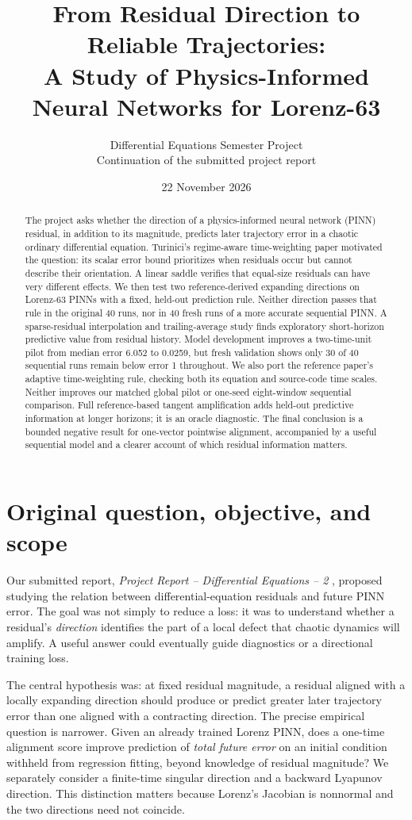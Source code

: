 \documentclass[11pt,a4paper]{article}
\title{From Residual Direction to Reliable Trajectories:\\A Study of Physics-Informed Neural Networks for Lorenz-63}
\author{Differential Equations Semester Project\\Continuation of the submitted project report}
\date{22 November 2026}
\begin{document}
\maketitle
\begin{abstract}
The project asks whether the direction of a physics-informed neural network (PINN) residual, in addition to its magnitude, predicts later trajectory error in a chaotic ordinary differential equation. Turinici's regime-aware time-weighting paper motivated the question: its scalar error bound prioritizes when residuals occur but cannot describe their orientation. A linear saddle verifies that equal-size residuals can have very different effects. We then test two reference-derived expanding directions on Lorenz-63 PINNs with a fixed, held-out prediction rule. Neither direction passes that rule in the original 40 runs, nor in 40 fresh runs of a more accurate sequential PINN. A sparse-residual interpolation and trailing-average study finds exploratory short-horizon predictive value from residual history. Model development improves a two-time-unit pilot from median error 6.052 to 0.0259, but fresh validation shows only 30 of 40 sequential runs remain below error 1 throughout. We also port the reference paper's adaptive time-weighting rule, checking both its equation and source-code time scales. Neither improves our matched global pilot or one-seed eight-window sequential comparison. Full reference-based tangent amplification adds held-out predictive information at longer horizons; it is an oracle diagnostic. The final conclusion is a bounded negative result for one-vector pointwise alignment, accompanied by a useful sequential model and a clearer account of which residual information matters.
\end{abstract}
\tableofcontents
\clearpage

\section{Original question, objective, and scope}
Our submitted report, \emph{Project Report -- Differential Equations -- 2} \cite{submitted}, proposed studying the relation between differential-equation residuals and future PINN error. The goal was not simply to reduce a loss: it was to understand whether a residual's \emph{direction} identifies the part of a local defect that chaotic dynamics will amplify. A useful answer could eventually guide diagnostics or a directional training loss.

The central hypothesis was: at fixed residual magnitude, a residual aligned with a locally expanding direction should produce or predict greater later trajectory error than one aligned with a contracting direction. The precise empirical question is narrower. Given an already trained Lorenz PINN, does a one-time alignment score improve prediction of \emph{total future error} on an initial condition withheld from regression fitting, beyond knowledge of residual magnitude? We separately consider a finite-time singular direction and a backward Lyapunov direction. This distinction matters because Lorenz's Jacobian is nonnormal and the two directions need not coincide.
\end{document}
